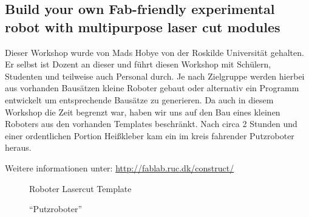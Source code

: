 \documentclass{\basedir/fablab-document}
\begin{document}
\subsection*{Build your own Fab-friendly experimental robot with multipurpose laser cut modules}

Dieser Workshop wurde von Mads Hobye von der Roskilde Universität
gehalten. Er selbst ist Dozent an dieser und führt diesen Workshop mit
Schülern, Studenten und teilweise auch Personal durch. Je nach
Zielgruppe werden hierbei aus vorhanden Bausätzen kleine Roboter gebaut
oder alternativ ein Programm entwickelt um entsprechende Bausätze zu
generieren. Da auch in diesem Workshop die Zeit begrenzt war, haben wir
uns auf den Bau eines kleinen Roboters aus den vorhanden Templates
beschränkt. Nach circa 2 Stunden und einer ordentlichen Portion
Heißkleber kam ein im kreis fahrender Putzroboter heraus.

Weitere informationen unter: \url{http://fablab.ruc.dk/construct/}

\begin{figure}[h]
	\noindent{}
	\caption{Roboter Lasercut Template}
	\label{roboterbausatz}
\end{figure}
\begin{figure}[h]
	\noindent{}
	\caption{``Putzroboter''}
	\label{putzroboter}
\end{figure}
\end{document}
